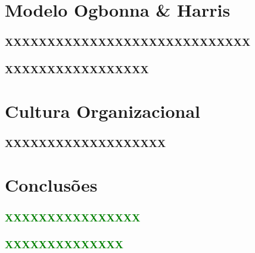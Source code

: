 \section{Modelo Ogbonna \& Harris}
\begin{frame}
\frametitle{XXXXXXXXXXXXXXXXXXXXXXXXXXXXX}
\end{frame}
\begin{frame}
\frametitle{XXXXXXXXXXXXXXXXX}
\end{frame}
\section{Cultura Organizacional}
\begin{frame}
\frametitle{XXXXXXXXXXXXXXXXXXX}
\end{frame}
\begin{frame}
\end{frame}
\section{Conclusões}
\begin{frame}
\frametitle{\textcolor{green}{XXXXXXXXXXXXXXXX}}
\end{frame}
\begin{frame}
\frametitle{\textcolor{green}{XXXXXXXXXXXXXX}}
\end{frame}
\begin{frame}
\end{frame}

